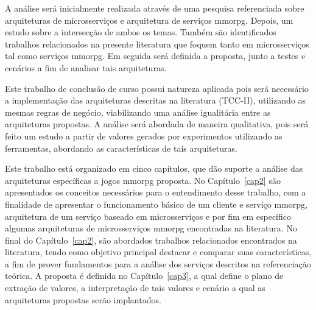 A análise será inicialmente realizada através de uma pesquisa referenciada sobre arquiteturas de microsserviços e arquitetura de serviços \ac{mmorpg}.
%
Depois, um estudo sobre a intersecção de ambos os temas.
%
Também são identificados trabalhos relacionados na presente literatura que foquem tanto em microsserviços tal como serviços \ac{mmorpg}.
%
Em seguida será definida a proposta, junto a testes e cenários a fim de analisar tais arquiteturas.



Este trabalho de conclusão de curso possui natureza aplicada pois será necessário a implementação das arquiteturas descritas na literatura (TCC-II), utilizando as mesmas regras de negócio, viabilizando uma análise igualitária entre as arquiteturas propostas.
%
A análise será abordada de maneira qualitativa, pois será feito um estudo a partir de valores gerados por experimentos utilizando as ferramentas, abordando as características de tais arquiteturas.



Este trabalho está organizado em cinco capítulos, que dão suporte a análise das arquiteturas específicas a jogos \ac{mmorpg} proposta.
%
No Capítulo~\ref{cap2} são apresentados os conceitos necessários para o entendimento desse trabalho, com a finalidade de apresentar o funcionamento básico de um cliente e serviço \ac{mmorpg}, arquitetura de um serviço baseado em microsserviços e por fim em específico algumas arquiteturas de microsserviços \ac{mmorpg} encontradas na literatura.
%
No final do Capítulo~\ref{cap2}, são abordados trabalhos relacionados encontrados na literatura, tendo como objetivo principal destacar e comparar suas características, a fim de prover fundamentos para a análise dos serviços descritos na referenciação teórica.
%
A proposta é definida no Capítulo~\ref{cap3}, a qual define o plano de extração de valores, a interpretação de tais valores e cenário a qual as arquiteturas propostas serão implantados.
%
